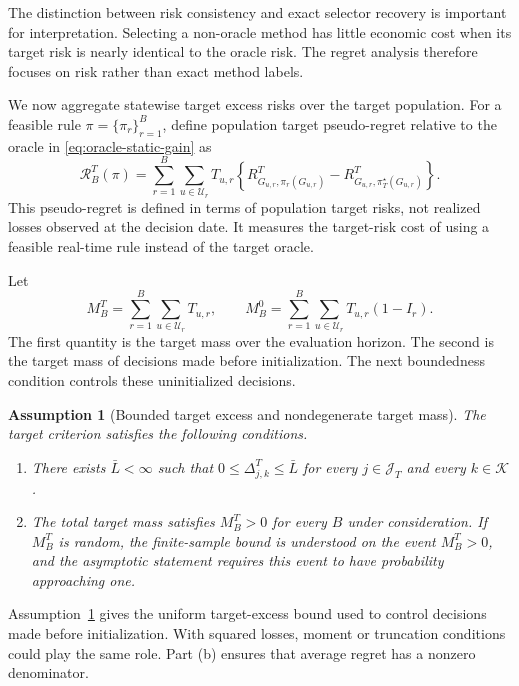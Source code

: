 \documentclass[a4paper, 12pt]{article}
\theoremstyle{plain}
\newtheorem{assumption}{Assumption}
\theoremstyle{remark}
\newcommand{\Kcal}{\mathcal{K}}
\newcommand{\Ucal}{\mathcal{U}}
\newcommand{\1}{\mathbf{1}}
\begin{document}
The distinction between risk consistency and exact selector recovery is important for interpretation. Selecting a non-oracle method has little economic cost when its target risk is nearly identical to the oracle risk. The regret analysis therefore focuses on risk rather than exact method labels.

We now aggregate statewise target excess risks over the target population. For a feasible rule \(\pi=\{\pi_r\}_{r=1}^B\), define population target pseudo-regret relative to the oracle in \eqref{eq:oracle-static-gain} as
\begin{equation}
\label{eq:target-regret}
    \mathcal R^T_B(\pi)
    =
    \sum_{r=1}^{B}\sum_{u\in\Ucal_r}
    T_{u,r}
    \left\{
    R^T_{G_{u,r},\pi_r(G_{u,r})}
    -
    R^T_{G_{u,r},\pi_T^\star(G_{u,r})}
    \right\} .
\end{equation}
This pseudo-regret is defined in terms of population target risks, not realized losses observed at the decision date. It measures the target-risk cost of using a feasible real-time rule instead of the target oracle.

Let
\begin{equation*}
    M^T_B=\sum_{r=1}^{B}\sum_{u\in\Ucal_r}T_{u,r},
    \qquad
    M^0_B=\sum_{r=1}^{B}\sum_{u\in\Ucal_r}T_{u,r}(1-I_r) .
\end{equation*}
The first quantity is the target mass over the evaluation horizon. The second is the target mass of decisions made before initialization. The next boundedness condition controls these uninitialized decisions.

\begin{assumption}[Bounded target excess and nondegenerate target mass]
\label{ass:bounded-target-excess}
The target criterion satisfies the following conditions.
\begin{enumerate}[label=(\alph*), leftmargin=*]
    \item There exists \(\bar L<\infty\) such that \(0\leq \Delta^T_{j,k}\leq \bar L\) for every \(j\in\mathcal J_T\) and every \(k\in\Kcal\).
    \item The total target mass satisfies \(M^T_B>0\) for every \(B\) under consideration. If \(M^T_B\) is random, the finite-sample bound is understood on the event \(M^T_B>0\), and the asymptotic statement requires this event to have probability approaching one.
\end{enumerate}
\end{assumption}

Assumption~\ref{ass:bounded-target-excess} gives the uniform target-excess bound used to control decisions made before initialization. With squared losses, moment or truncation conditions could play the same role. Part (b) ensures that average regret has a nonzero denominator.
\end{document}
